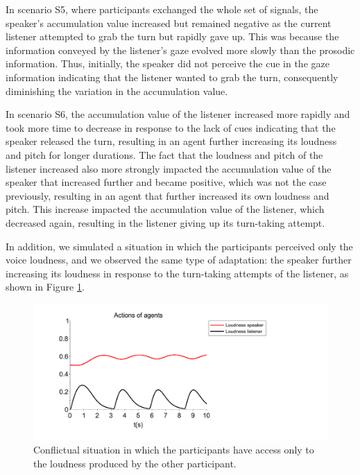 \documentclass[twocolumn]{svjour3}
\begin{document}
In scenario S5, where participants exchanged the whole set of signals, the speaker's accumulation value increased but remained negative as the current listener attempted to grab the turn but rapidly gave up. This was because the information conveyed by the listener's gaze evolved more slowly than the prosodic information. Thus, initially, the speaker did not perceive the cue in the gaze information indicating that the listener wanted to grab the turn,  consequently diminishing the variation in the accumulation value. 

In scenario S6, the accumulation value of the listener increased more rapidly and took more time to decrease in response to the lack of cues indicating that the speaker released the turn, resulting in an agent further increasing its loudness and pitch for longer durations. The fact that the loudness and pitch of the listener increased also more strongly impacted  the accumulation value of the speaker that increased further and became positive, which was not the case previously, resulting in an agent that further increased its own loudness and pitch. This increase impacted the accumulation value of the listener, which decreased again, resulting in the listener giving up its turn-taking attempt. 

In addition, we simulated a situation in which the participants perceived only the voice loudness, and we observed the same type of adaptation: the speaker further increasing  its loudness in response to the turn-taking attempts of the listener, as shown in Figure \ref{adapt_volume}.

\begin{figure}
  \centering
  \includegraphics[width=\linewidth]{figure/adapt_volume.pdf}
  \caption{Conflictual situation in which the participants have access only to the loudness produced by the other participant.}
  \label{adapt_volume}
\end{figure}
\end{document}
